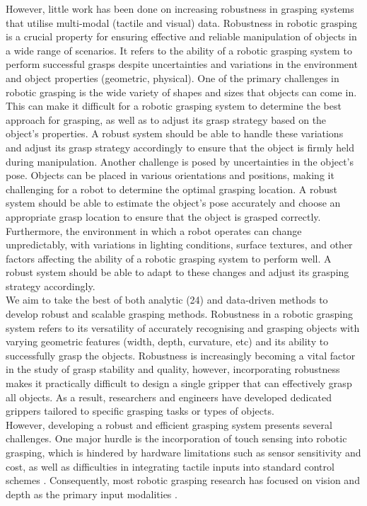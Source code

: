 \documentclass[11pt, a4paper]{report}
\begin{document}
However, little work has been done on increasing robustness in grasping systems that utilise multi-modal (tactile and visual) data. Robustness in robotic grasping is a crucial property for ensuring effective and reliable manipulation of objects in a wide range of scenarios. It refers to the ability of a robotic grasping system to perform successful grasps despite uncertainties and variations in the environment and object properties (geometric, physical). One of the primary challenges in robotic grasping is the wide variety of shapes and sizes that objects can come in. This can make it difficult for a robotic grasping system to determine the best approach for grasping, as well as to adjust its grasp strategy based on the object's properties. A robust system should be able to handle these variations and adjust its grasp strategy accordingly to ensure that the object is firmly held during manipulation. Another challenge is posed by uncertainties in the object's pose. Objects can be placed in various orientations and positions, making it challenging for a robot to determine the optimal grasping location. A robust system should be able to estimate the object's pose accurately and choose an appropriate grasp location to ensure that the object is grasped correctly. Furthermore, the environment in which a robot operates can change unpredictably, with variations in lighting conditions, surface textures, and other factors affecting the ability of a robotic grasping system to perform well. A robust system should be able to adapt to these changes and adjust its grasping strategy accordingly.\\


We aim to take the best of both analytic (24) and data-driven methods \cite{berscheid2020selfsupervised, pinto2015supersizing} to develop robust and scalable grasping methods. Robustness in a robotic grasping system refers to its versatility of accurately recognising and grasping objects with varying geometric features (width, depth, curvature, etc) and its ability to successfully grasp the objects. Robustness is increasingly becoming a vital factor in the study of grasp stability and quality, however, incorporating robustness makes it practically difficult to design a single gripper that can effectively grasp all objects. As a result, researchers and engineers have developed dedicated grippers tailored to specific grasping tasks or types of objects.\\

However, developing a robust and efficient grasping system presents several challenges. One major hurdle is the incorporation of touch sensing into robotic grasping, which is hindered by hardware limitations such as sensor sensitivity and cost, as well as difficulties in integrating tactile inputs into standard control schemes \cite{Calandra_2018}. Consequently, most robotic grasping research has focused on vision and depth as the primary input modalities \cite{Calandra_2018, de_Farias_2021}.
\end{document}
